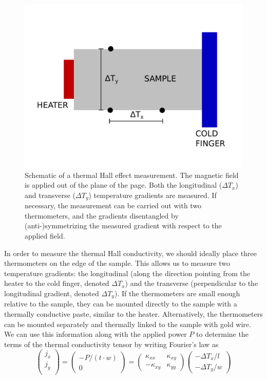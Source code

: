 \documentclass{thesis-umich}
\begin{document}
\begin{figure}
	\caption[Schematic of a Thermal Hall Effect Measurement]{Schematic of a thermal Hall effect measurement. The magnetic field is applied out of the plane of the page. Both the longitudinal ($\Delta T_x$) and transverse ($\Delta T_y$) temperature gradients are measured. If necessary, the measurement can be carried out with two thermometers, and the gradients disentangled by (anti-)symmetrizing the measured gradient with respect to the applied field.}
	\label{fig:thall_geometry}
	\includegraphics[width=\columnwidth]{figures/thall_geometry.pdf}
\end{figure}
In order to measure the thermal Hall conductivity, we should ideally place three thermometers on the edge of the sample. This allows us to measure two temperature gradients: the longitudinal (along the direction pointing from the heater to the cold finger, denoted $\Delta T_x$) and the transverse (perpendicular to the longitudinal gradient, denoted $\Delta T_y$). If the thermometers are small enough relative to the sample, they can be mounted directly to the sample with a thermally conductive paste, similar to the heater. Alternatively, the thermometers can be mounted separately and thermally linked to the sample with gold wire. We can use this information along with the applied power $P$ to determine the terms of the thermal conductivity tensor by writing Fourier's law as
\[ \begin{pmatrix}
		j_x \\
		j_y \\
\end{pmatrix}
= \begin{pmatrix}
	-P/(t\cdot w) \\
	0
\end{pmatrix}
= \begin{pmatrix}
	\kappa_{xx} & \kappa_{xy} \\
	-\kappa_{xy} & \kappa_{yy} 
\end{pmatrix}
\begin{pmatrix}
	-\Delta T_x/l \\
	-\Delta T_y/w
\end{pmatrix} \]
\end{document}
